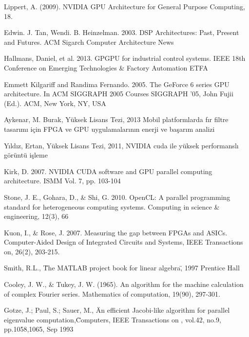 \newpage
\pagestyle{plain}


\begin{thebibliography}{99}

 Lippert, A. (2009). NVIDIA GPU Architecture for General Purpose Computing, 18.

 Edwin. J. Tan, Wendi. B. Heinzelman. 2003. DSP Architectures: Past, Present and Futures. ACM Sigarch Computer Architecture News

 Hallmans, Daniel, et al. 2013. GPGPU for industrial control systems. IEEE 18th Conference on Emerging Technologies \& Factory Automation ETFA

 Emmett Kilgariff and Randima Fernando. 2005. The GeForce 6 series GPU architecture. In ACM SIGGRAPH 2005 Courses SIGGRAPH '05, John Fujii (Ed.). ACM, New York, NY, USA

 Aykenar, M. Burak, Yüksek Lisans Tezi, 2013 Mobil platformlarda fır filtre tasarımı için FPGA ve GPU uygulamalarının enerji ve başarım analizi

 Yıldız, Ertan, Yüksek Lisans Tezi, 2011, NVIDIA cuda ile yüksek performanslı görüntü işleme

 Kirk, D. 2007. NVIDIA CUDA software and GPU parallel computing architecture. ISMM Vol. 7, pp. 103-104

 Stone, J. E., Gohara, D., \& Shi, G. 2010. OpenCL: A parallel programming standard for heterogeneous computing systems. Computing in science \& engineering, 12(3), 66

 Kuon, I., \& Rose, J. 2007. Measuring the gap between FPGAs and ASICs. Computer-Aided Design of Integrated Circuits and Systems, IEEE Transactions on, 26(2), 203-215.

Smith, R.L., \"The MATLAB project book for linear algebra\", 1997 Prentice Hall

 Cooley, J. W., \& Tukey, J. W. (1965). An algorithm for the machine calculation of complex Fourier series. Mathematics of computation, 19(90), 297-301.

 Gotze, J.; Paul, S.; Sauer, M., \"An efficient Jacobi-like algorithm for parallel eigenvalue computation,\" Computers, IEEE Transactions on , vol.42, no.9, pp.1058,1065, Sep 1993


\end{thebibliography}
